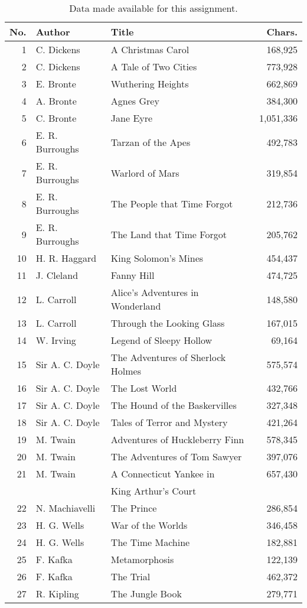 \documentclass[conference]{IEEEtran}
\begin{document}
\begin{table}
\caption{Data made available for this assignment.\label{tab:books}}
\vspace{-10pt}
\begin{center}
\begin{tabular}{r@{\hspace{1.1em}}l@{\hspace{1.1em}}l@{\hspace{0.75em}}r}
\hline
No. & Author & Title & Chars. \\
\hline
1  & C. Dickens & A Christmas Carol & 168,925 \\
2  & C. Dickens & A Tale of Two Cities & 773,928 \\
3  & E. Bronte & Wuthering Heights & 662,869 \\
4  & A. Bronte & Agnes Grey & 384,300 \\
5  & C. Bronte & Jane Eyre & 1,051,336 \\
6  & E. R. Burroughs & Tarzan of the Apes & 492,783 \\
7  & E. R. Burroughs & Warlord of Mars & 319,854 \\
8  & E. R. Burroughs & The People that Time Forgot & 212,736 \\
9  & E. R. Burroughs & The Land that Time Forgot & 205,762 \\
10 & H. R. Haggard & King Solomon's Mines & 454,437 \\
11 & J. Cleland & Fanny Hill & 474,725 \\
12 & L. Carroll & Alice's Adventures in Wonderland & 148,580 \\
13 & L. Carroll & Through the Looking Glass & 167,015 \\
14 & W. Irving & Legend of Sleepy Hollow & 69,164 \\
15 & Sir A. C. Doyle & The Adventures of Sherlock Holmes & 575,574 \\
16 & Sir A. C. Doyle & The Lost World & 432,766 \\
17 & Sir A. C. Doyle & The Hound of the Baskervilles & 327,348 \\
18 & Sir A. C. Doyle & Tales of Terror and Mystery & 421,264 \\
19 & M. Twain & Adventures of Huckleberry Finn & 578,345 \\
20 & M. Twain & The Adventures of Tom Sawyer & 397,076 \\
21 & M. Twain & A Connecticut Yankee in & 657,430 \\
   &          & King Arthur's Court & \\
22 & N. Machiavelli & The Prince & 286,854 \\
23 & H. G. Wells & War of the Worlds & 346,458 \\
24 & H. G. Wells & The Time Machine & 182,881 \\
25 & F. Kafka & Metamorphosis & 122,139 \\
26 & F. Kafka & The Trial & 462,372 \\
27 & R. Kipling & The Jungle Book & 279,771 \\
\hline
\end{tabular}
\end{center}
\end{table}
\end{document}
